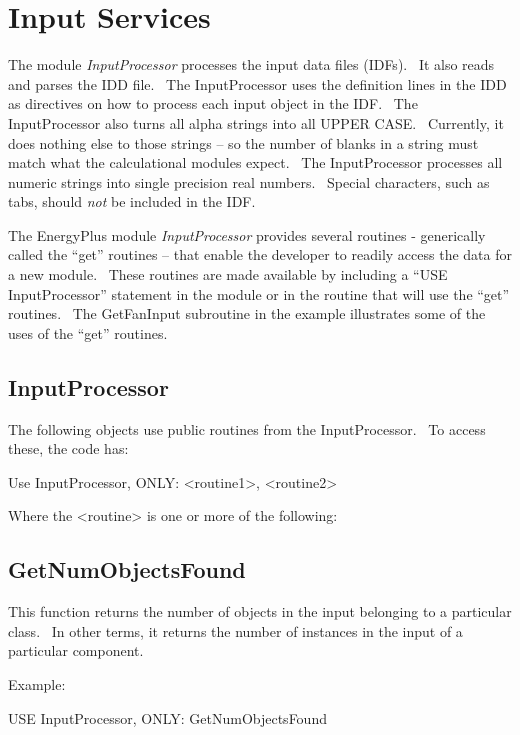 \section{Input Services}\label{input-services}

The module \emph{InputProcessor} processes the input data files (IDFs).~ It also reads and parses the IDD file.~ The InputProcessor uses the definition lines in the IDD as directives on how to process each input object in the IDF.~ The InputProcessor also turns all alpha strings into all UPPER CASE.~ Currently, it does nothing else to those strings -- so the number of blanks in a string must match what the calculational modules expect.~ The InputProcessor processes all numeric strings into single precision real numbers.~ Special characters, such as tabs, should \emph{not} be included in the IDF.

The EnergyPlus module \emph{InputProcessor} provides several routines - generically called the ``get'' routines -- that enable the developer to readily access the data for a new module.~ These routines are made available by including a ``USE InputProcessor'' statement in the module or in the routine that will use the ``get'' routines.~ The GetFanInput subroutine in the example illustrates some of the uses of the ``get'' routines.

\subsection{InputProcessor}\label{inputprocessor}

The following objects use public routines from the InputProcessor.~ To access these, the code has:

Use InputProcessor, ONLY: \textless{}routine1\textgreater{}, \textless{}routine2\textgreater{}

Where the \textless{}routine\textgreater{} is one or more of the following:

\subsection{GetNumObjectsFound}\label{getnumobjectsfound}

This function returns the number of objects in the input belonging to a particular class.~ In other terms, it returns the number of instances in the input of a particular component.

Example:

USE InputProcessor, ONLY: GetNumObjectsFound

